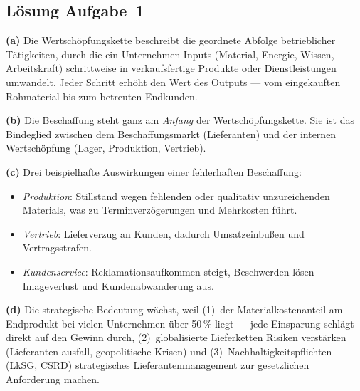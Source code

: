 \documentclass[11pt, a4paper]{article}
\begin{document}
\subsection*{Lösung Aufgabe~1}
\begin{loesung}
\textbf{(a)} Die Wertschöpfungskette beschreibt die geordnete Abfolge betrieblicher
Tätigkeiten, durch die ein Unternehmen Inputs (Material, Energie, Wissen, Arbeitskraft)
schrittweise in verkaufsfertige Produkte oder Dienstleistungen umwandelt. Jeder Schritt
erhöht den Wert des Outputs --- vom eingekauften Rohmaterial bis zum betreuten Endkunden.

\textbf{(b)} Die Beschaffung steht ganz am \emph{Anfang} der Wertschöpfungskette. Sie
ist das Bindeglied zwischen dem Beschaffungsmarkt (Lieferanten) und der internen
Wertschöpfung (Lager, Produktion, Vertrieb).

\textbf{(c)} Drei beispielhafte Auswirkungen einer fehlerhaften Beschaffung:
\begin{itemize}[itemsep=0pt]
  \item \emph{Produktion}: Stillstand wegen fehlenden oder qualitativ unzureichenden Materials, was zu Termin\-verzögerungen und Mehrkosten führt.
  \item \emph{Vertrieb}: Lieferverzug an Kunden, dadurch Umsatzeinbußen und Vertragsstrafen.
  \item \emph{Kundenservice}: Reklamations\-aufkommen steigt, Beschwerden lösen Image\-verlust und Kundenabwanderung aus.
\end{itemize}

\textbf{(d)} Die strategische Bedeutung wächst, weil (1)~der Materialkostenanteil am
Endprodukt bei vielen Unternehmen über 50\,\% liegt --- jede Einsparung schlägt direkt
auf den Gewinn durch, (2)~globalisierte Lieferketten Risiken verstärken (Lieferanten\-
ausfall, geopolitische Krisen) und (3)~Nachhaltigkeit\-spflichten (LkSG, CSRD)
strategisches Lieferantenmanagement zur gesetzlichen Anforderung machen.
\end{loesung}
\end{document}
